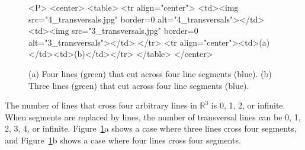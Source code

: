 \begin{figure}
\label{fig:intro}
\begin{ccHtmlOnly}
<P>
<center>
<table>
<tr align="center">
<td><img src="4_transversals.jpg" border=0 alt="4_transversals"></td>
<td><img src="3_transversals.jpg" border=0 alt="3_transversals"></td>
</tr>
<tr align="center"><td>(a)</td><td>(b)</td></tr>
</table>
</center>
\end{ccHtmlOnly}
\begin{center}
\caption{(a) Four lines (green) that cut across four line segments (blue).
  (b) Three lines (green) that cut across four line segments (blue).}
\end{center}
\label{fig:transversal-3-4}
\end{figure}

The number of lines that cross four arbitrary lines in $\mathbb{R}^3$ is
0, 1, 2, or infinite. When segments are replaced by lines, the number of
transversal lines can be 0, 1, 2, 3, 4, or infinite.
Figure~\ref{fig:transversal-3-4}a shows a case where three lines cross
four segments, and Figure~\ref{fig:transversal-3-4}b shows a case where
four lines cross four segments.

